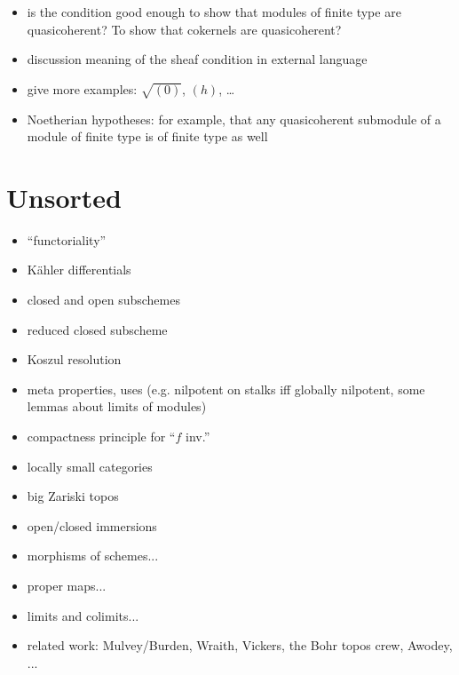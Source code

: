 \documentclass[10pt]{amsart}
\theoremstyle{definition}
\theoremstyle{plain}
\theoremstyle{remark}
\newcommand{\?}{\,{:}\,}
\renewcommand{\_}{\mathpunct{.}\,}
\begin{document}
\begin{itemize}
\item is the condition good enough to show that modules of finite type are
quasicoherent? To show that cokernels are quasicoherent?
\item discussion meaning of the sheaf condition in external language
\item give more examples: $\sqrt{(0)}$, $(h)$, \ldots
\item Noetherian hypotheses: for example, that any quasicoherent submodule of a
module of finite type is of finite type as well
\end{itemize}


\section{Unsorted}
\begin{itemize}
\item ``functoriality''
\item Kähler differentials
\item closed and open subschemes
\item reduced closed subscheme
\item Koszul resolution
\item meta properties, uses (e.g. nilpotent on stalks iff globally nilpotent,
some lemmas about limits of modules)
\item compactness principle for ``$f$ inv.''
\item locally small categories
\item big Zariski topos
\item open/closed immersions
\item morphisms of schemes...
\item proper maps...
\item limits and colimits...
\item related work: Mulvey/Burden, Wraith, Vickers, the Bohr topos crew, Awodey, ...
\end{itemize}


\nocite{*}
\printbibliography
\end{document}
